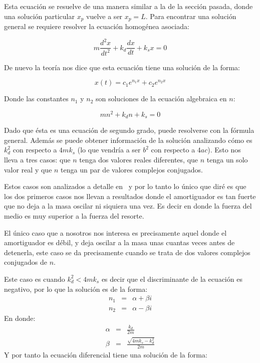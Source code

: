 Esta ecuación se resuelve de una manera similar a la de la sección pasada, donde una solución particular $x_p$ vuelve a ser $x_p = L$.
Para encontrar una solución general se requiere resolver la ecuación homogénea asociada:

\begin{equation}
m \frac{d^2x}{dt^2} + k_d\frac{dx}{dt} + k_s x = 0
\end{equation}

De nuevo la teoría nos dice que esta ecuación tiene una solución de la forma:

\begin{equation}
x(t) = c_1 e^{n_1 x} + c_2 e^{n_2 x} \nonumber
\end{equation}

Donde las constantes $n_1$ y $n_2$ son soluciones de la ecuación algebraica en $n$:

\begin{equation}
m n^2 +  k_d n + k_s = 0
\end{equation}

Dado que ésta es una ecuación de segundo grado, puede resolverse con la fórmula general.
Además se puede obtener información de la solución analizando cómo es $k_d^2$ con respecto a $4 m k_s$ (lo que vendría a ser $b^2$ con respecto a $4ac$).
Esto nos lleva a tres casos: que $n$ tenga dos valores reales diferentes, que $n$ tenga un solo valor real y que $n$ tenga un par de valores complejos conjugados.

Estos casos son analizados a detalle en~\cite{Ross:Ecuaciones} y por lo tanto lo único que diré es que los dos primeros casos nos llevan a resultados donde el amortiguador es tan fuerte que no deja a la masa oscilar ni siquiera una vez.
Es decir en donde la fuerza del medio es muy superior a la fuerza del resorte.

El único caso que a nosotros nos interesa es precisamente aquel donde el amortiguador es débil, y deja oscilar a la masa unas cuantas veces antes de detenerla, este caso se da precisamente cuando se trata de dos valores complejos conjugados de $n$. 

Este caso es cuando $k_d^2 < 4 m k_s$ es decir que el discriminante de la ecuación es negativo, por lo que la solución es de la forma:
\begin{eqnarray}
n_1 & = & \alpha + \beta i \nonumber \\
n_2 & = & \alpha - \beta i \nonumber
\end{eqnarray}
En donde:
\begin{eqnarray}
\alpha & = & \frac{k_d}{2m} \nonumber \\
\beta  & = & \frac{\sqrt{4 m k_s - k_d^2}}{2m} \nonumber
\end{eqnarray}
Y por tanto la ecuación diferencial tiene una solución de la forma:

